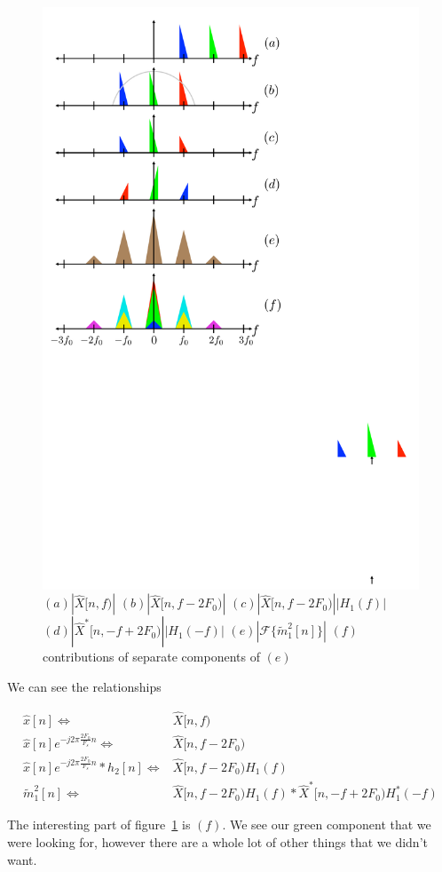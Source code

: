 \documentclass [11pt, proquest] {uwthesis}[2015/03/03]
\begin{document}
\begin{figure}[!ht]
\label{fig:harmonic_envelope_estimate}
  \centering
    \includegraphics[width=.62\textwidth]{harmonic_envelope_estimate}   
    \caption{$(a) | \widehat{X}[n,f) |$   
    				$(b) | \widehat{X}[n,f - 2F_0) |$  
				$(c) | \widehat{X}[n,f - 2F_0) | | H_1(f) |$
				$(d) | \widehat{X}^*[n,-f + 2F_0) | | H_1(-f) |$
				$(e) | \mathcal{F} \{ \tilde{m}_1^2[n] \} |$
				$(f)$ contributions of separate components of $(e)$}
\end{figure}

We can see the relationships

\begin{align}
\widehat{x}[n] \Longleftrightarrow& \widehat{X}[n,f) \\
\widehat{x}[n]e^{-j2\pi \frac{2F_0}{F_s}n} \Longleftrightarrow& \widehat{X}[n,f - 2F_0) \\
\widehat{x}[n]e^{-j2\pi \frac{2F_0}{F_s}n} * h_2[n] \Longleftrightarrow& \widehat{X}[n,f - 2F_0) H_1(f) \\
\tilde{m}_1^2[n] \Longleftrightarrow& \widehat{X}[n,f - 2F_0) H_1(f) * \widehat{X}^*[n,-f + 2F_0) H_1^*(-f)
\end{align}

The interesting part of figure~\ref{fig:harmonic_envelope_estimate} is $(f)$.  We see our green component that we were looking for, however there are a whole lot of other things that we didn't want.
\end{document}
